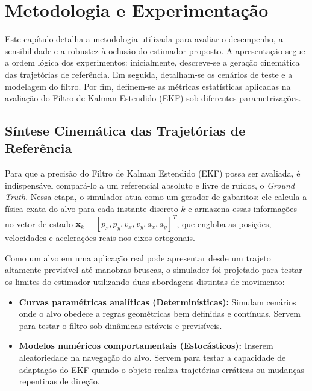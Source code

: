 \section{Metodologia e Experimentação}
\label{sec:methodology}

Este capítulo detalha a metodologia utilizada para avaliar o desempenho, a sensibilidade e a robustez à oclusão do estimador proposto. A apresentação segue a ordem lógica dos experimentos: inicialmente, descreve-se a geração cinemática das trajetórias de referência. Em seguida, detalham-se os cenários de teste e a modelagem do filtro. Por fim, definem-se as métricas estatísticas aplicadas na avaliação do Filtro de Kalman Estendido (EKF) sob diferentes parametrizações.

\subsection{Síntese Cinemática das Trajetórias de Referência}
\label{subsec:trajectory_generation}

Para que a precisão do Filtro de Kalman Estendido (EKF) possa ser avaliada, é indispensável compará-lo a um referencial absoluto e livre de ruídos, o \textit{Ground Truth}. Nessa etapa, o simulador atua como um gerador de gabaritos: ele calcula a física exata do alvo para cada instante discreto $k$ e armazena essas informações no vetor de estado $\mathbf{x}_k = [p_{x}, p_{y}, v_{x}, v_{y}, a_{x}, a_{y}]^T$, que engloba as posições, velocidades e acelerações reais nos eixos ortogonais.

Como um alvo em uma aplicação real pode apresentar desde um trajeto altamente previsível até manobras bruscas, o simulador foi projetado para testar os limites do estimador utilizando duas abordagens distintas de movimento:
\begin{itemize}
    \item \textbf{Curvas paramétricas analíticas (Determinísticas):} Simulam cenários onde o alvo obedece a regras geométricas bem definidas e contínuas. Servem para testar o filtro sob dinâmicas estáveis e previsíveis.
    \item \textbf{Modelos numéricos comportamentais (Estocásticos):} Inserem aleatoriedade na navegação do alvo. Servem para testar a capacidade de adaptação do EKF quando o objeto realiza trajetórias erráticas ou mudanças repentinas de direção.
\end{itemize}

